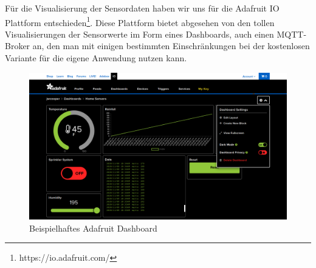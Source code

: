 Für die Visualisierung der Sensordaten haben wir uns für die Adafruit IO Plattform entschieden\footnote{https://io.adafruit.com/}. Diese Plattform bietet abgesehen von den tollen Visualisierungen der Sensorwerte im Form eines Dashboards, auch einen MQTT-Broker an, den man mit einigen bestimmten Einschränkungen bei der kostenlosen Variante für die eigene Anwendung nutzen kann. 

\begin{figure}[h]
	 \centering
	 \includegraphics[width=1\textwidth]{pictures/adafruitdashboard}
	 \caption[Beispielhaftes Adafruit Dashboard]{Beispielhaftes Adafruit Dashboard\cite{adafruitdash}}
	 \label{fig:adafruitdashboard}
\end{figure}